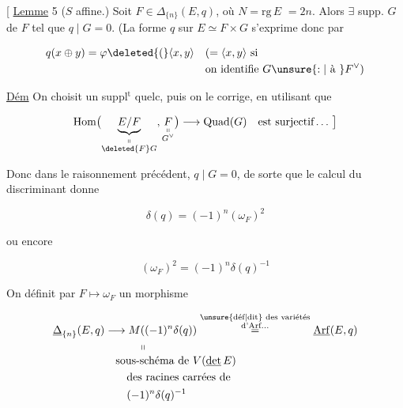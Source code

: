 
[ \uline{Lemme} 5 ($S$ affine.) Soit $F\in\Delta_{\{n\}}(E,q)$, où $N=\mathrm{rg}\,E$  $=2n$. Alors $\exists$ supp. $G$ de $F$ tel que $q\mid G=0$. (La forme $q$ sur $E\simeq F\times G$ s'exprime donc par

\[
\begin{aligned}
q(x\oplus y)&=\varphi\deleted{(}\langle x,y\rangle &&(=\langle x,y\rangle\ \text{si}\\
&&&\text{on identifie }G\unsure{:|\text{ à }}F^\vee)
\end{aligned}
\]

\uline{Dém} On choisit un suppl$^{\mathrm t}$ quelc, puis on le corrige, en utilisant que

\[
\mathrm{Hom}\bigl(\underbrace{E/F}_{\substack{\shortparallel\\ \deleted{F}G}},\underset{\substack{\shortparallel\\G^\vee}}{F}\bigr)
\longrightarrow\mathrm{Quad}(G)\quad\text{est surjectif}\ldots\ \bigr]
\]

Donc dans le raisonnement précédent,  $q\mid G=0$, de sorte que le calcul du discriminant donne

\[
\delta(q)=(-1)^n(\omega_F)^2
\]

ou encore

\[
\boxed{(\omega_F)^2=(-1)^n\delta(q)^{-1}}
\]


On définit par $F\longmapsto\omega_F$ un morphisme

\[
\begin{aligned}
\underline{\Delta}_{\{n\}}(E,q)&\longrightarrow
M((-1)^n\delta(q))\overset{\substack{\text{\unsure{déf|dit} des variétés}\\\text{d'Arf}\ldots}}{=}\underline{\mathrm{Arf}}(E,q)\\[-2pt]
&\hspace{3em}\shortparallel\\[-2pt]
&\quad\text{sous-schéma de }V(\underline{\det}\,E)\\
&\qquad\text{des racines carrées de}\\
&\qquad (-1)^n\delta(q)^{-1}
\end{aligned}
\]

